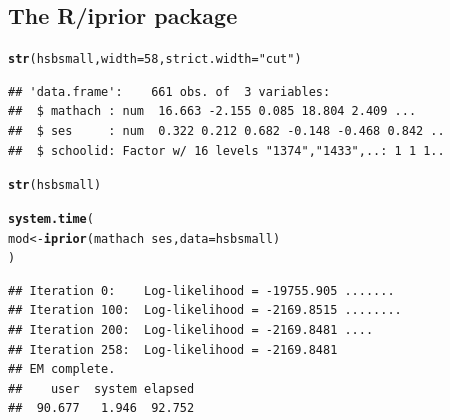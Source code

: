 \documentclass{beamer}\usepackage[]{graphicx}\usepackage[]{color}
\makeatletter
\newcommand{\hlnum}[1]{\textcolor[rgb]{0.686,0.059,0.569}{#1}}%
\newcommand{\hlstr}[1]{\textcolor[rgb]{0.192,0.494,0.8}{#1}}%
\newcommand{\hlopt}[1]{\textcolor[rgb]{0,0,0}{#1}}%
\newcommand{\hlstd}[1]{\textcolor[rgb]{0.345,0.345,0.345}{#1}}%
\newcommand{\hlkwb}[1]{\textcolor[rgb]{0.69,0.353,0.396}{#1}}%
\newcommand{\hlkwc}[1]{\textcolor[rgb]{0.333,0.667,0.333}{#1}}%
\newcommand{\hlkwd}[1]{\textcolor[rgb]{0.737,0.353,0.396}{\textbf{#1}}}%
\newenvironment{kframe}{%
 \def\at@end@of@kframe{}%
 \ifinner\ifhmode%
  \def\at@end@of@kframe{\end{minipage}}%
  \begin{minipage}{\columnwidth}%
 \fi\fi%
 \def\FrameCommand##1{\hskip\@totalleftmargin \hskip-\fboxsep
 \colorbox{shadecolor}{##1}\hskip-\fboxsep
     \hskip-\linewidth \hskip-\@totalleftmargin \hskip\columnwidth}%
 \MakeFramed {\advance\hsize-\width
   \@totalleftmargin\z@ \linewidth\hsize
   \@setminipage}}%
 {\par\unskip\endMakeFramed%
 \at@end@of@kframe}
\newenvironment{knitrout}{}{} %
\makeatother
\begin{document}
\subsection{The R/iprior package}


\newsavebox{\ipriordemoa}
\begin{lrbox}{\ipriordemoa}
\begin{knitrout}\small
{}\color{fgcolor}\begin{kframe}
\begin{alltt}
\hlkwd{str}\hlstd{(hsbsmall,} \hlkwc{width} \hlstd{=} \hlnum{58}\hlstd{,} \hlkwc{strict.width} \hlstd{=} \hlstr{"cut"}\hlstd{)}
\end{alltt}
\begin{verbatim}
## 'data.frame':	661 obs. of  3 variables:
##  $ mathach : num  16.663 -2.155 0.085 18.804 2.409 ...
##  $ ses     : num  0.322 0.212 0.682 -0.148 -0.468 0.842 ..
##  $ schoolid: Factor w/ 16 levels "1374","1433",..: 1 1 1..
\end{verbatim}
\end{kframe}
\end{knitrout}
\end{lrbox}

\newsavebox{\ipriordemoaa}
\begin{lrbox}{\ipriordemoaa}
\begin{knitrout}\small
{}\color{fgcolor}\begin{kframe}
\begin{alltt}
\hlkwd{str}\hlstd{(hsbsmall)}
\end{alltt}
\end{kframe}
\end{knitrout}
\end{lrbox}

\newsavebox{\ipriordemob}
\begin{lrbox}{\ipriordemob}
\begin{knitrout}\small
{}\color{fgcolor}\begin{kframe}
\begin{alltt}
\hlkwd{system.time}\hlstd{(}
  \hlstd{mod} \hlkwb{<-} \hlkwd{iprior}\hlstd{(mathach} \hlopt{~} \hlstd{ses,} \hlkwc{data} \hlstd{= hsbsmall)}
\hlstd{)}
\end{alltt}
\begin{verbatim}
## Iteration 0:    Log-likelihood = -19755.905 .......
## Iteration 100:  Log-likelihood = -2169.8515 ........
## Iteration 200:  Log-likelihood = -2169.8481 ....
## Iteration 258:  Log-likelihood = -2169.8481 
## EM complete.
##    user  system elapsed 
##  90.677   1.946  92.752
\end{verbatim}
\end{kframe}
\end{knitrout}
\end{lrbox}
\end{document}
